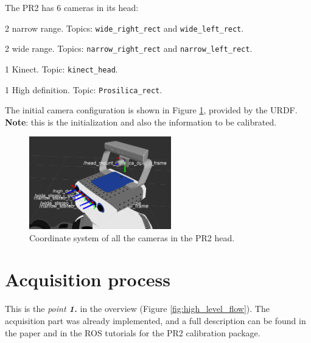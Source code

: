 The PR2 has 6 cameras in its head:
\begin{itemize*}
 \item 2 narrow range. Topics: \texttt{wide\_right\_rect} and \texttt{wide\_left\_rect}.
 \item 2 wide range. Topics: \texttt{narrow\_right\_rect} and \texttt{narrow\_left\_rect}.
 \item 1 Kinect. Topic: \texttt{kinect\_head}.
 \item 1 High definition. Topic: \texttt{Prosilica\_rect}.
\end{itemize*}

\noindent
The initial camera configuration is shown in Figure \ref{fig:pr2_cameras}, provided by the URDF. \textbf{Note}: this is the initialization and also the information to be calibrated.
\begin{figure}[!htbp]
 \centering
 \includegraphics[width=0.55\textwidth]{images/screenshots/PR2_cameras.png}
 \caption{Coordinate system of all the cameras in the PR2 head.}
 \label{fig:pr2_cameras}
\end{figure}






\section{Acquisition process}
\label{sec:acquisition}

This is the \textit{point \textbf{1.}} in the overview (Figure \ref{fig:high_level_flow}). The acquisition part was already implemented, and a full description can be found in the paper  \cite{pr2_calibration_paper} and in the ROS tutorials for the PR2 calibration package.

%


